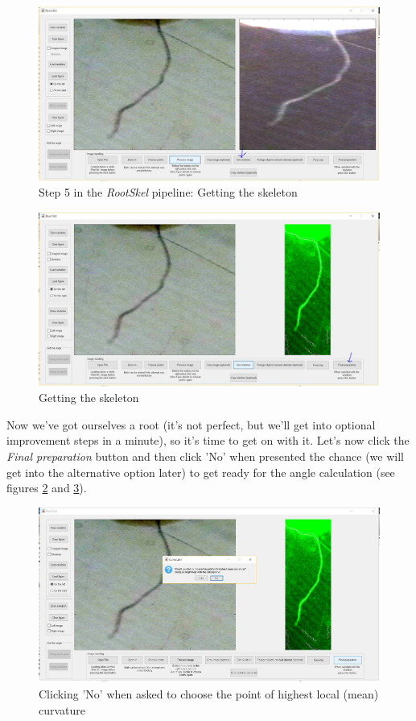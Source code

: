 \begin{figure}[H]
	\centering
	\includegraphics[width=\textwidth]{../Figures/manual/step15.jpg}
	\caption{Step 5 in the \textit{RootSkel} pipeline: Getting the skeleton}
	\label{fig:img18}
\end{figure}

\begin{figure}[H]
	\centering
	\includegraphics[width=\textwidth]{../Figures/manual/step16.jpg}
	\caption{Getting the skeleton}
	\label{fig:img19}
\end{figure}

Now we've got ourselves a root (it's not perfect, but we'll get into optional improvement steps in a minute), so it's time to get on with it. 
Let's now click the \textit{Final preparation} button and then click 'No' when presented the chance (we will get into the alternative option later) to get ready for the angle calculation (see figures \ref{fig:img19} and \ref{fig:img20}).

\begin{figure}[H]
	\centering
	\includegraphics[width=\textwidth]{../Figures/manual/step17.jpg}
	\caption{Clicking 'No' when asked to choose the point of highest local (mean) curvature}
	\label{fig:img20}
\end{figure}

